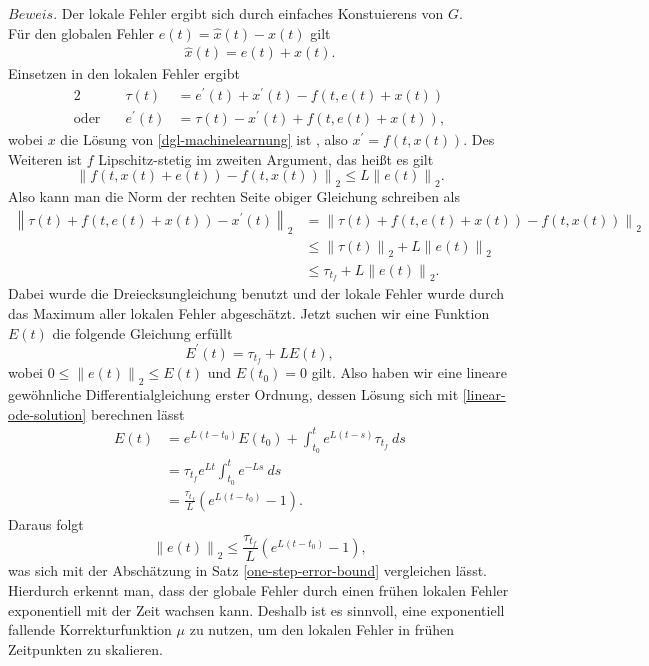 $Beweis.$ Der lokale Fehler ergibt sich durch einfaches Konstuierens von $G$.\\
Für den globalen Fehler $e(t) = \hat{x}(t) - x(t)$ gilt
\begin{align*}
    \hat{x}(t) = e(t) + x(t).
\end{align*}
Einsetzen in den lokalen Fehler ergibt
\begin{alignat*}{2}
    &\tau(t) &= e^{\prime}(t) + x^{\prime}(t) - f(t,e(t)+x(t))\\
    \text{oder} \quad &e^{\prime}(t) &= \tau(t) - x^{\prime}(t) + f(t,e(t) + x(t)),
\end{alignat*}
wobei $x$ die Lösung von \eqref{dgl-machinelearnung} ist , also $x^{\prime}=f(t,x(t))$. Des Weiteren ist $f$
Lipschitz-stetig im zweiten Argument,
das heißt es gilt
\[
    \left\lVert f(t,x(t)+e(t)) - f(t,x(t)) \right\rVert_2 \leq L \left\lVert e(t) \right\rVert_2.
\]
Also kann man die Norm der rechten Seite obiger Gleichung schreiben als
\begin{align*}
    \left\lVert \tau(t) + f(t,e(t) + x(t)) - x^{\prime}(t) \right\rVert_2
    &= \left\lVert \tau(t) + f(t,e(t) + x(t)) - f(t,x(t)) \right\rVert_2 \\
    &\leq \left\lVert \tau(t) \right\rVert_2 + L\left\lVert e(t) \right\rVert_2 \\
    &\leq \tau_{t_f} + L \left\lVert e(t) \right\rVert_2.
\end{align*}
Dabei wurde die Dreiecksungleichung benutzt und der lokale Fehler wurde durch das Maximum aller lokalen Fehler
abgeschätzt. Jetzt suchen wir eine Funktion $E(t)$ die folgende Gleichung erfüllt
\[
    E^{\prime}(t) = \tau_{t_f} + L E(t),
\]
wobei $0 \leq \left\lVert e(t) \right\rVert_2 \leq E(t)$ und $E(t_0) = 0$ gilt. Also haben wir eine lineare gewöhnliche
Differentialgleichung erster Ordnung, dessen Lösung sich mit \eqref{linear-ode-solution} berechnen lässt
\begin{align*}
    E(t) &= e^{L(t-t_0)}E(t_0) + \int_{t_0}^{t}e^{L(t-s)}\tau_{t_f}\ ds \\
    &= \tau_{t_f} e^{Lt} \int_{t_0}^{t}e^{-Ls}\ ds \\
    &= \frac{\tau_{t_f} }{L} \left( e^{L(t-t_0)} - 1 \right).
\end{align*}
Daraus folgt
\[
    \left\lVert e(t) \right\rVert_2 \leq \frac{\tau_{t_f}}{L} \left( e^{L(t-t_0)} - 1 \right),
\]
was sich mit der Abschätzung in Satz \ref{one-step-error-bound} vergleichen lässt. \qedwhite\\
Hierdurch erkennt man, dass der globale Fehler durch einen frühen lokalen Fehler exponentiell mit der Zeit wachsen
kann. Deshalb ist es sinnvoll, eine exponentiell fallende Korrekturfunktion $\mu$ zu nutzen, um den lokalen Fehler in
frühen Zeitpunkten zu skalieren.

